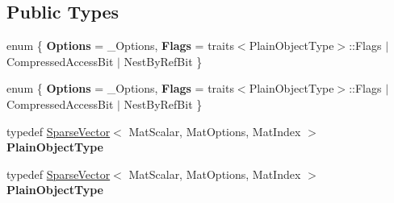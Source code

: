 \subsection*{Public Types}
\begin{DoxyCompactItemize}
\item 
\mbox{\label{struct_eigen_1_1internal_1_1traits_3_01_ref_3_01_sparse_vector_3_01_mat_scalar_00_01_mat_optionsd46b48c0b126a924a96003bc7b99d5a2_ab5e09a6cb5fb1f53c576379de67095b2}} 
enum \{ {\bfseries Options} = \+\_\+\+Options, 
{\bfseries Flags} = traits$<$Plain\+Object\+Type$>$\+:\+:Flags $\vert$ Compressed\+Access\+Bit $\vert$ Nest\+By\+Ref\+Bit
 \}
\item 
\mbox{\label{struct_eigen_1_1internal_1_1traits_3_01_ref_3_01_sparse_vector_3_01_mat_scalar_00_01_mat_optionsd46b48c0b126a924a96003bc7b99d5a2_af88c05316d334e8aa0cca713767d2262}} 
enum \{ {\bfseries Options} = \+\_\+\+Options, 
{\bfseries Flags} = traits$<$Plain\+Object\+Type$>$\+:\+:Flags $\vert$ Compressed\+Access\+Bit $\vert$ Nest\+By\+Ref\+Bit
 \}
\item 
\mbox{\label{struct_eigen_1_1internal_1_1traits_3_01_ref_3_01_sparse_vector_3_01_mat_scalar_00_01_mat_optionsd46b48c0b126a924a96003bc7b99d5a2_aaf4444213ac3f213f1ce25c88f4562e7}} 
typedef \hyperlink{group___sparse_core___module_class_eigen_1_1_sparse_vector}{Sparse\+Vector}$<$ Mat\+Scalar, Mat\+Options, Mat\+Index $>$ {\bfseries Plain\+Object\+Type}
\item 
\mbox{\label{struct_eigen_1_1internal_1_1traits_3_01_ref_3_01_sparse_vector_3_01_mat_scalar_00_01_mat_optionsd46b48c0b126a924a96003bc7b99d5a2_aaf4444213ac3f213f1ce25c88f4562e7}} 
typedef \hyperlink{group___sparse_core___module_class_eigen_1_1_sparse_vector}{Sparse\+Vector}$<$ Mat\+Scalar, Mat\+Options, Mat\+Index $>$ {\bfseries Plain\+Object\+Type}
\end{DoxyCompactItemize}


